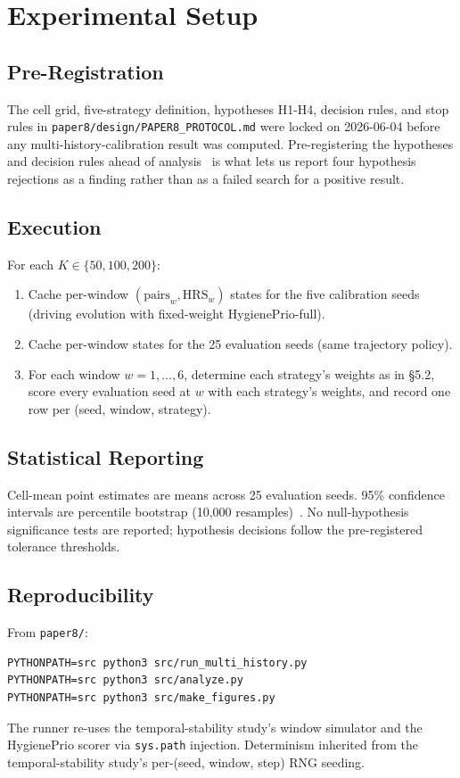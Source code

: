 \section{Experimental Setup}

\subsection{Pre-Registration}

The cell grid, five-strategy definition, hypotheses H1-H4, decision
rules, and stop rules in \texttt{paper8/design/PAPER8\_PROTOCOL.md}
were locked on 2026-06-04 before any multi-history-calibration result
was computed. Pre-registering the hypotheses and decision rules ahead
of analysis~\cite{nosek2018preregistration} is what lets us report
four hypothesis rejections as a finding rather than as a failed
search for a positive result.

\subsection{Execution}

For each $K \in \{50, 100, 200\}$:
\begin{enumerate}
\item Cache per-window $(\text{pairs}_w, \text{HRS}_w)$ states for the
five calibration seeds (driving evolution with fixed-weight HygienePrio-full).
\item Cache per-window states for the 25 evaluation seeds (same trajectory policy).
\item For each window $w = 1, \ldots, 6$, determine each strategy's
weights as in \S5.2, score every evaluation seed at $w$ with each
strategy's weights, and record one row per (seed, window, strategy).
\end{enumerate}

\subsection{Statistical Reporting}

Cell-mean point estimates are means across 25 evaluation seeds. 95\%
confidence intervals are percentile bootstrap (10{,}000
resamples)~\cite{efron1994introduction,diciccio1996bootstrap}.
No null-hypothesis significance tests are reported; hypothesis decisions
follow the pre-registered tolerance thresholds.

\subsection{Reproducibility}

From \texttt{paper8/}:
{\small\begin{verbatim}
PYTHONPATH=src python3 src/run_multi_history.py
PYTHONPATH=src python3 src/analyze.py
PYTHONPATH=src python3 src/make_figures.py
\end{verbatim}}
The runner re-uses the temporal-stability study's window simulator and the HygienePrio scorer
via \texttt{sys.path} injection. Determinism inherited from the temporal-stability study's
per-(seed, window, step) RNG seeding.
